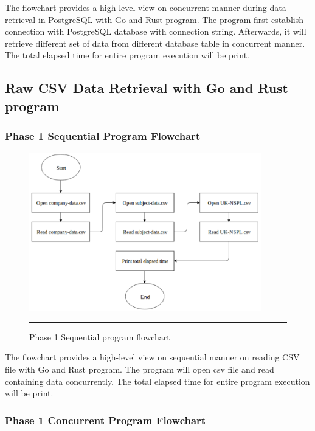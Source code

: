 The flowchart provides a high-level view on concurrent manner during data retrieval in PostgreSQL with Go and Rust program. The program first establish connection with PostgreSQL database with connection string. Afterwards, it will retrieve different set of data from different database table in concurrent manner. The total elapsed time for entire program execution will be print. 

\subsection{Raw CSV Data Retrieval with Go and Rust program}

\subsubsection{Phase 1 Sequential Program Flowchart}

\begin{figure}[H]
	\centering
	\includegraphics[width=0.9\textwidth]{Figure/seq-read-csv.png}
	\rule{35em}{0.5pt}
	\caption[Phase 1 Sequential program flowchart]{Phase 1 Sequential program flowchart}
\end{figure}

The flowchart provides a high-level view on sequential manner on reading CSV file with Go and Rust program. The program will open csv file and read containing data concurrently. The total elapsed time for entire program execution will be print.

\subsubsection{Phase 1 Concurrent Program Flowchart}

